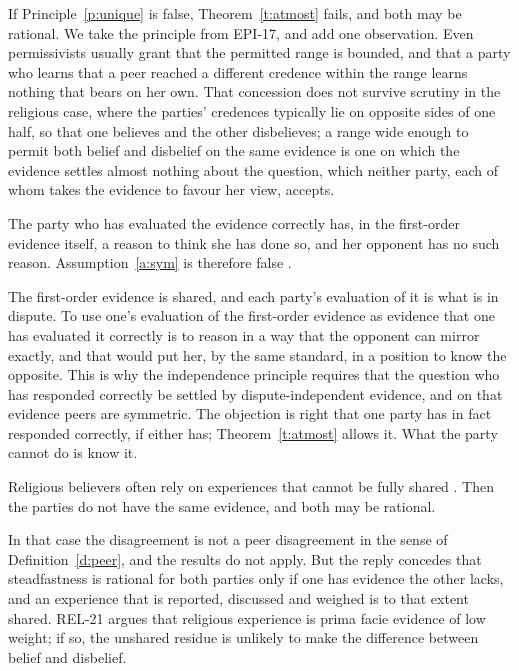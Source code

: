 \documentclass{situationist-preprint}
\begin{document}
\begin{reply}
If Principle~\ref{p:unique} is false, Theorem~\ref{t:atmost} fails, and both may be rational. We take the principle from EPI-17, and add one observation. Even permissivists usually grant that the permitted range is bounded, and that a party who learns that a peer reached a different credence within the range learns nothing that bears on her own. That concession does not survive scrutiny in the religious case, where the parties' credences typically lie on opposite sides of one half, so that one believes and the other disbelieves; a range wide enough to permit both belief and disbelief on the same evidence is one on which the evidence settles almost nothing about the question, which neither party, each of whom takes the evidence to favour her view, accepts.
\end{reply}

\begin{objection}
The party who has evaluated the evidence correctly has, in the first-order evidence itself, a reason to think she has done so, and her opponent has no such reason. Assumption~\ref{a:sym} is therefore false \citep{Kelly2005}.
\end{objection}

\begin{reply}
The first-order evidence is shared, and each party's evaluation of it is what is in dispute. To use one's evaluation of the first-order evidence as evidence that one has evaluated it correctly is to reason in a way that the opponent can mirror exactly, and that would put her, by the same standard, in a position to know the opposite. This is why the independence principle requires that the question who has responded correctly be settled by dispute-independent evidence, and on that evidence peers are symmetric. The objection is right that one party has in fact responded correctly, if either has; Theorem~\ref{t:atmost} allows it. What the party cannot do is know it.
\end{reply}

\begin{objection}
Religious believers often rely on experiences that cannot be fully shared \citep{Alston1991}. Then the parties do not have the same evidence, and both may be rational.
\end{objection}

\begin{reply}
In that case the disagreement is not a peer disagreement in the sense of Definition~\ref{d:peer}, and the results do not apply. But the reply concedes that steadfastness is rational for both parties only if one has evidence the other lacks, and an experience that is reported, discussed and weighed is to that extent shared. REL-21 argues that religious experience is prima facie evidence of low weight; if so, the unshared residue is unlikely to make the difference between belief and disbelief.
\end{reply}
\end{document}
